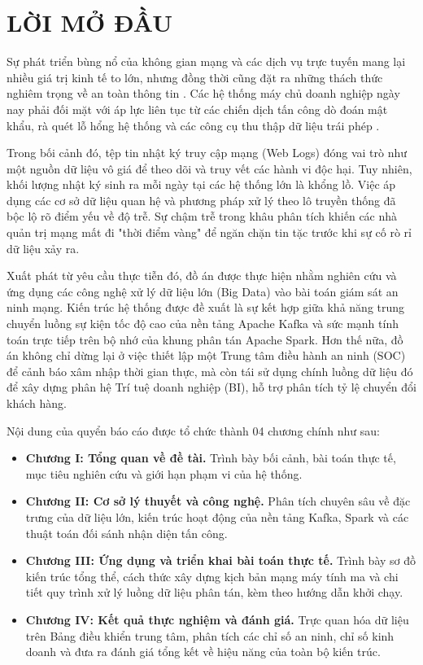 \documentclass[12pt,a4paper]{report}
\begin{document}
\chapter*{LỜI MỞ ĐẦU}

Sự phát triển bùng nổ của không gian mạng và các dịch vụ trực tuyến mang lại nhiều giá trị kinh tế to lớn, nhưng đồng thời cũng đặt ra những thách thức nghiêm trọng về an toàn thông tin \cite{vnisa2023}. Các hệ thống máy chủ doanh nghiệp ngày nay phải đối mặt với áp lực liên tục từ các chiến dịch tấn công dò đoán mật khẩu, rà quét lỗ hổng hệ thống và các công cụ thu thập dữ liệu trái phép \cite{owasp2021}. 

Trong bối cảnh đó, tệp tin nhật ký truy cập mạng (Web Logs) đóng vai trò như một nguồn dữ liệu vô giá để theo dõi và truy vết các hành vi độc hại. Tuy nhiên, khối lượng nhật ký sinh ra mỗi ngày tại các hệ thống lớn là khổng lồ. Việc áp dụng các cơ sở dữ liệu quan hệ và phương pháp xử lý theo lô truyền thống đã bộc lộ rõ điểm yếu về độ trễ. Sự chậm trễ trong khâu phân tích khiến các nhà quản trị mạng mất đi "thời điểm vàng" để ngăn chặn tin tặc trước khi sự cố rò rỉ dữ liệu xảy ra.

Xuất phát từ yêu cầu thực tiễn đó, đồ án được thực hiện nhằm nghiên cứu và ứng dụng các công nghệ xử lý dữ liệu lớn (Big Data) vào bài toán giám sát an ninh mạng. Kiến trúc hệ thống được đề xuất là sự kết hợp giữa khả năng trung chuyển luồng sự kiện tốc độ cao của nền tảng Apache Kafka và sức mạnh tính toán trực tiếp trên bộ nhớ của khung phân tán Apache Spark. Hơn thế nữa, đồ án không chỉ dừng lại ở việc thiết lập một Trung tâm điều hành an ninh (SOC) để cảnh báo xâm nhập thời gian thực, mà còn tái sử dụng chính luồng dữ liệu đó để xây dựng phân hệ Trí tuệ doanh nghiệp (BI), hỗ trợ phân tích tỷ lệ chuyển đổi khách hàng.

Nội dung của quyển báo cáo được tổ chức thành 04 chương chính như sau:
\begin{itemize}
    \item \textbf{Chương I: Tổng quan về đề tài.} Trình bày bối cảnh, bài toán thực tế, mục tiêu nghiên cứu và giới hạn phạm vi của hệ thống.
    \item \textbf{Chương II: Cơ sở lý thuyết và công nghệ.} Phân tích chuyên sâu về đặc trưng của dữ liệu lớn, kiến trúc hoạt động của nền tảng Kafka, Spark và các thuật toán đối sánh nhận diện tấn công.
    \item \textbf{Chương III: Ứng dụng và triển khai bài toán thực tế.} Trình bày sơ đồ kiến trúc tổng thể, cách thức xây dựng kịch bản mạng máy tính ma và chi tiết quy trình xử lý luồng dữ liệu phân tán, kèm theo hướng dẫn khởi chạy.
    \item \textbf{Chương IV: Kết quả thực nghiệm và đánh giá.} Trực quan hóa dữ liệu trên Bảng điều khiển trung tâm, phân tích các chỉ số an ninh, chỉ số kinh doanh và đưa ra đánh giá tổng kết về hiệu năng của toàn bộ kiến trúc.
\end{itemize}
\end{document}
